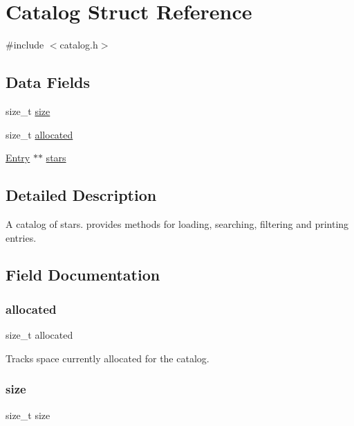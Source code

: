 \hypertarget{struct_catalog}{}\section{Catalog Struct Reference}
\label{struct_catalog}


{\ttfamily \#include $<$catalog.\+h$>$}

\subsection*{Data Fields}
\begin{DoxyCompactItemize}
\item 
size\+\_\+t \mbox{\hyperlink{struct_catalog_a854352f53b148adc24983a58a1866d66}{size}}
\item 
size\+\_\+t \mbox{\hyperlink{struct_catalog_ae1bb12c74f8787980ecef2b1f772239b}{allocated}}
\item 
\mbox{\hyperlink{struct_entry}{Entry}} $\ast$$\ast$ \mbox{\hyperlink{struct_catalog_ae9a5d6bc40976d00eef67a78d939d3d3}{stars}}
\end{DoxyCompactItemize}


\subsection{Detailed Description}
A catalog of stars. provides methods for loading, searching, filtering and printing entries. 

\subsection{Field Documentation}
\mbox{\label{struct_catalog_ae1bb12c74f8787980ecef2b1f772239b}} 
\subsubsection{\texorpdfstring{allocated}{allocated}}
{\footnotesize\ttfamily size\+\_\+t allocated}

Tracks space currently allocated for the catalog. \mbox{\label{struct_catalog_a854352f53b148adc24983a58a1866d66}} 
\subsubsection{\texorpdfstring{size}{size}}
{\footnotesize\ttfamily size\+\_\+t size}

